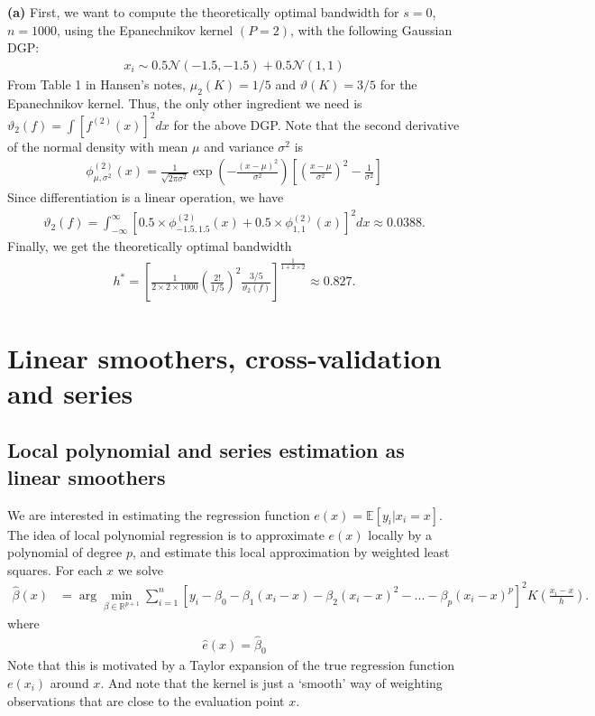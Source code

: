 \documentclass[12pt]{article}
\newcommand{\R}{\mathbb{R}}
\newcommand{\E}{\mathbb{E}}
\newcommand{\mtx}[1]{\ensuremath{\bm{\mathit{#1}}}}
\newcommand{\N}{\mathcal{N}}
\begin{document}
\textbf{(a)} First, we want to compute the theoretically optimal bandwidth for $s=0$, $n=1000$, using the Epanechnikov kernel $(P=2)$, with the following Gaussian DGP:
\begin{align*}
x_i \sim 0.5 \N(-1.5,-1.5) + 0.5\N(1,1)
\end{align*}
From Table 1 in Hansen's notes, $\mu_2(K)=1/5$ and $\vartheta(K)=3/5$ for the Epanechnikov kernel. Thus, the only other ingredient we need is $\vartheta_{2}(f) = \int [f^{(2)}(x)]^2 dx$ for the above DGP. Note that the second derivative of the normal density with mean $\mu$ and variance $\sigma^2$ is
\begin{align*}
\phi^{(2)}_{\mu, \sigma^2}(x) = \frac{1}{\sqrt{2\pi \sigma^2}}\exp\left(-\frac{(x-\mu)^2}{\sigma^2}\right)\left[\left(\frac{x-\mu}{\sigma^2}\right)^2 - \frac{1}{\sigma^2}\right]
\end{align*}
Since differentiation is a linear operation, we have
\begin{align*}
\vartheta_{2}(f) = \int_{-\infty}^\infty [0.5\times\phi^{(2)}_{-1.5, 1.5}(x) + 0.5\times \phi^{(2)}_{1, 1}(x)]^2 dx \approx 0.0388.
\end{align*}
Finally, we get the theoretically optimal bandwidth
\begin{align*}
h^* = \left[\frac{1}{2 \times 2 \times 1000}\left(\frac{2!}{1/5}\right)^2\frac{3/5}{\vartheta_{2}(f)}\right]^{\frac{1}{1+2\times 2}} \approx 0.827.
\end{align*}

\newpage

\section{Linear smoothers, cross-validation and series}

\subsection{Local polynomial and series estimation as linear smoothers} We are interested in estimating the regression function $e(x) = \E[y_i | x_i = x]$. The idea of local polynomial regression is to approximate $e(x)$ locally by a polynomial of degree $p$, and estimate this local approximation by weighted least squares. For each $x$ we solve
\begin{align*}
\hat{\mtx{\beta}}(x) &= \arg \min_{\beta \in \R^{p+1}}\sum_{i=1}^n[y_i - \beta_0 - \beta_1(x_i-x) - \beta_2(x_i-x)^2 -...-\beta_p(x_i-x)^p]^2K\left(\frac{x_i - x}{h}\right).
\end{align*}
where
\begin{align*}
\hat e(x) = \hat \beta_0
\end{align*}
Note that this is motivated by a Taylor expansion of the true regression function $e(x_i)$ around $x$. And note that the kernel is just a `smooth' way of weighting observations that are close to the evaluation point $x$.\\
\end{document}
